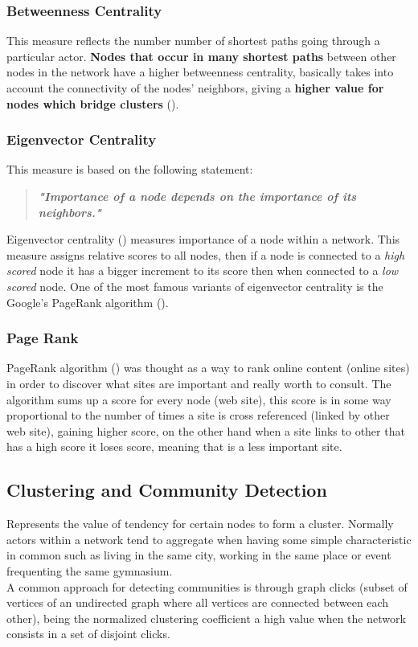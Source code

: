 \subsubsection*{Betweenness Centrality}
This measure reflects the number number of shortest paths going through a particular actor. \textbf{Nodes that
occur in many shortest paths} between other nodes in the network have a higher betweenness centrality, basically
takes into account the connectivity of the nodes' neighbors, giving a \textbf{higher value for nodes which bridge clusters} (\cite{politaktivsna}).

\subsubsection*{Eigenvector Centrality}
This measure is based on the following statement:

\begin{quote}
\textbf{\textit{"Importance of a node depends on the importance of its neighbors."}}
\end{quote}

Eigenvector centrality (\cite{politaktivsna}) measures importance of a node within a network. This measure assigns relative scores to all nodes, then if
a node is connected to a \textit{high scored} node it has a bigger increment to its score then when connected to a \textit{low scored} node.
One of the most famous variants of eigenvector centrality is the Google's PageRank algorithm (\cite{brin1998anatomy}).

\subsubsection*{Page Rank}
PageRank algorithm (\cite{brin1998anatomy}) was thought as a way to rank online content (online sites) in order to discover
what sites are important and really worth to consult. The algorithm sums up a score for every node (web site),
this score is in some way proportional to the number of times a site is cross referenced (linked by other web site), gaining higher score,
on the other hand when a site links to other that has a high score it loses score, meaning that is a less important site.

\subsection{Clustering and Community Detection}
Represents the value of tendency for certain nodes to form a cluster. Normally actors within a network tend to aggregate when having some
simple characteristic in common such as living in the same city, working in the same place or event frequenting the same gymnasium.\\
\indent A common approach for detecting communities is through graph clicks (subset of vertices of an
undirected graph where all vertices are connected between each other), being the normalized clustering coefficient a high value
when the network consists in a set of disjoint clicks.

